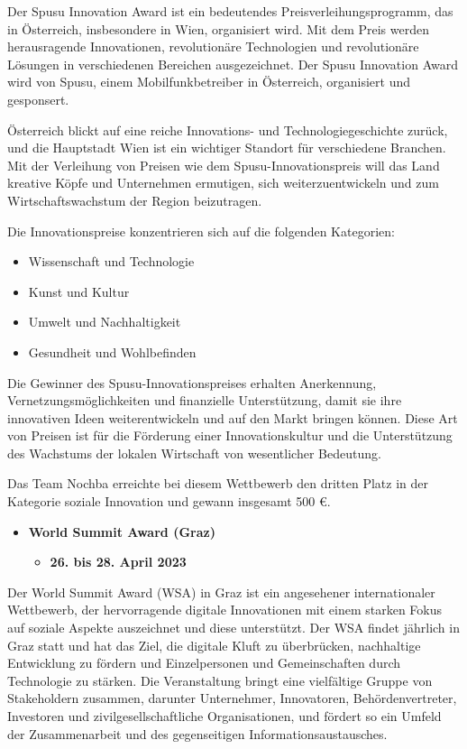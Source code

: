 Der Spusu Innovation Award ist ein bedeutendes Preisverleihungsprogramm, das in Österreich, insbesondere in Wien, organisiert wird. Mit dem Preis werden herausragende Innovationen, revolutionäre Technologien und revolutionäre Lösungen in verschiedenen Bereichen ausgezeichnet. Der Spusu Innovation Award wird von Spusu, einem Mobilfunkbetreiber in Österreich, organisiert und gesponsert.

Österreich blickt auf eine reiche Innovations- und Technologiegeschichte zurück, und die Hauptstadt Wien ist ein wichtiger Standort für verschiedene Branchen. Mit der Verleihung von Preisen wie dem Spusu-Innovationspreis will das Land kreative Köpfe und Unternehmen ermutigen, sich weiterzuentwickeln und zum Wirtschaftswachstum der Region beizutragen.

Die Innovationspreise konzentrieren sich auf die folgenden Kategorien:

\begin{itemize}
    \item {Wissenschaft und Technologie}
    \item {Kunst und Kultur}
    \item {Umwelt und Nachhaltigkeit}
    \item {Gesundheit und Wohlbefinden}
\end{itemize}

Die Gewinner des Spusu-Innovationspreises erhalten Anerkennung, Vernetzungsmöglichkeiten und finanzielle Unterstützung, damit sie ihre innovativen Ideen weiterentwickeln und auf den Markt bringen können. Diese Art von Preisen ist für die Förderung einer Innovationskultur und die Unterstützung des Wachstums der lokalen Wirtschaft von wesentlicher Bedeutung.

Das Team Nochba erreichte bei diesem Wettbewerb den dritten Platz in der Kategorie soziale Innovation und gewann insgesamt 500 €.


\begin{itemize}
    \item \textbf{World Summit Award (Graz)}
    \begin{itemize}
        \item \textbf{26. bis 28. April 2023}
    \end{itemize}
\end{itemize}

Der World Summit Award (WSA) in Graz ist ein angesehener internationaler Wettbewerb, der hervorragende digitale Innovationen mit einem starken Fokus auf soziale Aspekte auszeichnet und diese unterstützt. Der WSA findet jährlich in Graz statt und hat das Ziel, die digitale Kluft zu überbrücken, nachhaltige Entwicklung zu fördern und Einzelpersonen und Gemeinschaften durch Technologie zu stärken. Die Veranstaltung bringt eine vielfältige Gruppe von Stakeholdern zusammen, darunter Unternehmer, Innovatoren, Behördenvertreter, Investoren und zivilgesellschaftliche Organisationen, und fördert so ein Umfeld der Zusammenarbeit und des gegenseitigen Informationsaustausches.

